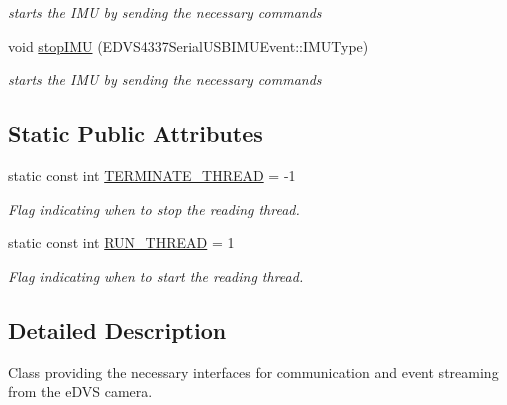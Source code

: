 \begin{DoxyCompactItemize}
\begin{DoxyCompactList}\small\item\em starts the I\+M\+U by sending the necessary commands \end{DoxyCompactList}\item 
\hypertarget{class_e_d_v_s4337_serial_u_s_b_ad7cd708dd39311ac007d30927e335a5b}{}void \hyperlink{class_e_d_v_s4337_serial_u_s_b_ad7cd708dd39311ac007d30927e335a5b}{stop\+I\+M\+U} (E\+D\+V\+S4337\+Serial\+U\+S\+B\+I\+M\+U\+Event\+::\+I\+M\+U\+Type)\label{class_e_d_v_s4337_serial_u_s_b_ad7cd708dd39311ac007d30927e335a5b}

\begin{DoxyCompactList}\small\item\em starts the I\+M\+U by sending the necessary commands \end{DoxyCompactList}\end{DoxyCompactItemize}
\subsection*{Static Public Attributes}
\begin{DoxyCompactItemize}
\item 
\hypertarget{class_e_d_v_s4337_serial_u_s_b_a97c4bc902063509a0934e0aa07a3a0c2}{}static const int \hyperlink{class_e_d_v_s4337_serial_u_s_b_a97c4bc902063509a0934e0aa07a3a0c2}{T\+E\+R\+M\+I\+N\+A\+T\+E\+\_\+\+T\+H\+R\+E\+A\+D} = -\/1\label{class_e_d_v_s4337_serial_u_s_b_a97c4bc902063509a0934e0aa07a3a0c2}

\begin{DoxyCompactList}\small\item\em Flag indicating when to stop the reading thread. \end{DoxyCompactList}\item 
\hypertarget{class_e_d_v_s4337_serial_u_s_b_a89f3d76801ef1b50641ecb6cd5c7e113}{}static const int \hyperlink{class_e_d_v_s4337_serial_u_s_b_a89f3d76801ef1b50641ecb6cd5c7e113}{R\+U\+N\+\_\+\+T\+H\+R\+E\+A\+D} = 1\label{class_e_d_v_s4337_serial_u_s_b_a89f3d76801ef1b50641ecb6cd5c7e113}

\begin{DoxyCompactList}\small\item\em Flag indicating when to start the reading thread. \end{DoxyCompactList}\end{DoxyCompactItemize}


\subsection{Detailed Description}
Class providing the necessary interfaces for communication and event streaming from the e\+D\+V\+S camera. 

